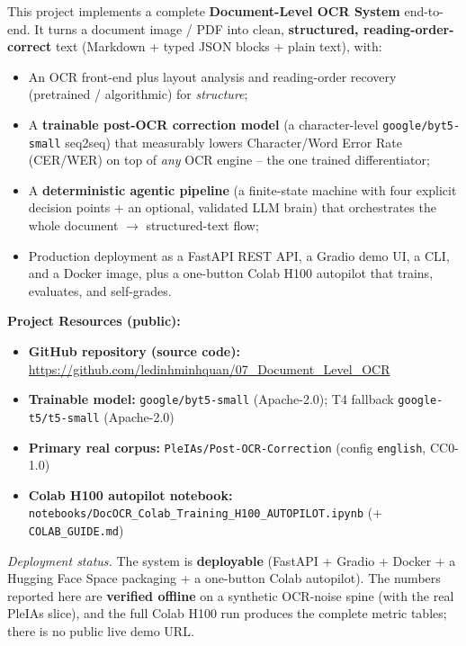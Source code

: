 \documentclass[12pt,a4paper]{article}
\begin{document}
This project implements a complete \textbf{Document-Level OCR System} end-to-end. It turns a document image / PDF into clean, \textbf{structured, reading-order-correct} text (Markdown + typed JSON blocks + plain text), with:
\begin{itemize}
  \item An OCR front-end plus layout analysis and reading-order recovery (pretrained / algorithmic) for \emph{structure};
  \item A \textbf{trainable post-OCR correction model} (a character-level \texttt{google/byt5-small} seq2seq) that measurably lowers Character/Word Error Rate (CER/WER) on top of \emph{any} OCR engine -- the one trained differentiator;
  \item A \textbf{deterministic agentic pipeline} (a finite-state machine with four explicit decision points + an optional, validated LLM brain) that orchestrates the whole document $\rightarrow$ structured-text flow;
  \item Production deployment as a FastAPI REST API, a Gradio demo UI, a CLI, and a Docker image, plus a one-button Colab H100 autopilot that trains, evaluates, and self-grades.
\end{itemize}

\textbf{Project Resources (public):}
\begin{itemize}\setlength\itemsep{0.15em}
  \item \textbf{GitHub repository (source code):} \url{https://github.com/ledinhminhquan/07_Document_Level_OCR}
  \item \textbf{Trainable model:} \texttt{google/byt5-small} (Apache-2.0); T4 fallback \texttt{google-t5/t5-small} (Apache-2.0)
  \item \textbf{Primary real corpus:} \texttt{PleIAs/Post-OCR-Correction} (config \texttt{english}, CC0-1.0)
  \item \textbf{Colab H100 autopilot notebook:} \texttt{notebooks/DocOCR\_Colab\_Training\_H100\_AUTOPILOT.ipynb} (+ \texttt{COLAB\_GUIDE.md})
\end{itemize}

\noindent\textit{Deployment status.} The system is \textbf{deployable} (FastAPI + Gradio + Docker + a Hugging Face Space packaging + a one-button Colab autopilot). The numbers reported here are \textbf{verified offline} on a synthetic OCR-noise spine (with the real PleIAs slice), and the full Colab H100 run produces the complete metric tables; there is no public live demo URL.

\end{document}

